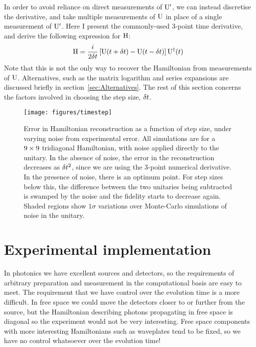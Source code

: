 In order to avoid reliance on direct measurements of \(\mathrm{U}^{\prime}\), we
can instead discretise the derivative, and take multiple measurements of
\(\mathrm{U}\) in place of a single measurement of \(\mathrm{U}^{\prime}\). Here I
present the commonly-used 3-point time derivative, and derive the following
expression for \(\mathrm{H}\):
\begin{equation}
  \mathrm{H} = \frac{i}{2 \delta t} \left[ \mathrm{U} \!\left(t+\delta t\right) - \mathrm{U} \!\left(t-\delta t\right)
  \right] \mathrm{U}^{\dagger} \!\left(t\right)
\end{equation}
Note that this is not the only way to recover the Hamiltonian from measurements
of \(\mathrm{U}\). Alternatives, such as the matrix logarithm and series expansions
are discussed briefly in section~\ref{sec:Alternatives}. The rest of this
section concerns the factors involved in choosing the step size, \(\delta t\).
\begin{figure}[t]
  \centering
  \texttt{[image: figures/timestep]}
  \caption[Error in Hamiltonian reconstruction as a function of step size]
  {Error in Hamiltonian reconstruction as a function of step size, under varying
  noise from experimental error. All simulations are for a \(9 \times 9\)
  tridiagonal Hamiltonian, with noise applied directly to the unitary.
  In the absence of noise, the error in the
  reconstruction decreases as \(\delta t^{2}\), since we are using the 3-point
  numerical derivative. In the presence of noise, there is an optimum point. For
  step sizes below this, the difference between the two unitaries being
  subtracted is swamped by the noise and the fidelity starts to decrease again.
  Shaded regions show \(1 \sigma\) variations over Monte-Carlo simulations of
  noise in the unitary.}
  \label{fig:stepsize}
\end{figure}


\section{Experimental implementation}
\label{sec:HTExperiment}
In photonics we have excellent sources and detectors, so the requirements of
arbitrary preparation and measurement in the computational basis are easy to
meet. The requirement that we have control over the evolution time is a more
difficult. In free space we could move the detectors closer to or further from
the source, but the Hamiltonian describing photons propagating in free space is
diagonal so the experiment would not be very interesting. Free space components
with more interesting Hamiltonians such as waveplates tend to be fixed, so we
have no control whatsoever over the evolution time!

